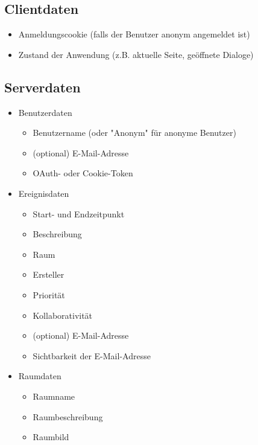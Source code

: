 
\subsection*{Clientdaten}
\begin{itemize}
    \item Anmeldungscookie (falls der Benutzer anonym angemeldet ist)
    \item Zustand der Anwendung (z.B. aktuelle Seite, geöffnete Dialoge)
\end{itemize}

\subsection*{Serverdaten}
\begin{itemize}
    \item Benutzerdaten \begin{itemize}
        \item Benutzername (oder "Anonym" für anonyme Benutzer)
        \item (optional) E-Mail-Adresse
        \item OAuth- oder Cookie-Token
    \end{itemize}
    \item Ereignisdaten \begin{itemize}
        \item Start- und Endzeitpunkt 
        \item Beschreibung
        \item Raum
        \item Ersteller
        \item Priorität
        \item Kollaborativität
        \item (optional) E-Mail-Adresse
        \item Sichtbarkeit der E-Mail-Adresse
    \end{itemize}
    \item Raumdaten \begin{itemize}
        \item Raumname
        \item Raumbeschreibung
        \item Raumbild
    \end{itemize}
\end{itemize}